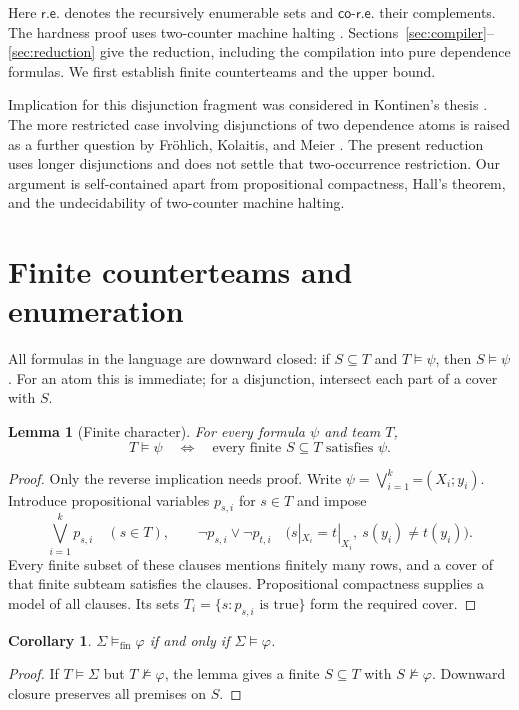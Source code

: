 \documentclass[11pt,a4paper]{article}
\newcommand{\dep}[2]{\mathord{=}(#1;#2)}
\newcommand{\fin}{\mathrm{fin}}
\newcommand{\RE}{\mathsf{r.e.}}
\newcommand{\coRE}{\mathsf{co\text{-}r.e.}}
\newtheorem{lemma}[theorem]{Lemma}
\newtheorem{corollary}[theorem]{Corollary}
\theoremstyle{definition}
\begin{document}
Here $\RE$ denotes the recursively enumerable sets and $\coRE$ their
complements. The hardness proof uses two-counter machine halting
\cite{Dudenhefner22}. Sections~\ref{sec:compiler}--\ref{sec:reduction}
give the reduction, including the compilation into pure dependence
formulas. We first establish finite counterteams and the upper bound.

Implication for this disjunction fragment was considered in
Kontinen's thesis \cite[Section~7.3]{Kontinen10}. The more restricted
case involving disjunctions of two dependence atoms is raised as a
further question by Fr\"ohlich, Kolaitis, and Meier
\cite[Section~6]{FKM26}. The present reduction uses longer disjunctions
and does not settle that two-occurrence restriction. Our argument is
self-contained apart from propositional compactness, Hall's theorem,
and the undecidability of two-counter machine halting.

\section{Finite counterteams and enumeration}
All formulas in the language are downward closed: if $S\subseteq T$ and
$T\models\psi$, then $S\models\psi$. For an atom this is immediate;
for a disjunction, intersect each part of a cover with $S$.

\begin{lemma}[Finite character]
\label{lem:finite-character}
For every formula $\psi$ and team $T$,
\[
 T\models\psi
 \quad\Longleftrightarrow\quad
 \text{every finite }S\subseteq T\text{ satisfies }\psi.
\]
\end{lemma}
\begin{proof}
Only the reverse implication needs proof. Write
$\psi=\bigvee_{i=1}^k\dep{X_i}{y_i}$. Introduce propositional variables
$p_{s,i}$ for $s\in T$ and impose
\[
 \bigvee_{i=1}^k p_{s,i}\quad(s\in T),
 \qquad
 \neg p_{s,i}\vee\neg p_{t,i}
 \quad\bigl(s|_{X_i}=t|_{X_i},\ s(y_i)\ne t(y_i)\bigr).
\]
Every finite subset of these clauses mentions finitely many rows, and
a cover of that finite subteam satisfies the clauses. Propositional
compactness supplies a model of all clauses. Its sets
$T_i=\{s:p_{s,i}\text{ is true}\}$ form the required cover.
\end{proof}

\begin{corollary}
\label{cor:finite}
$\Sigma\models_{\fin}\varphi$ if and only if $\Sigma\models\varphi$.
\end{corollary}
\begin{proof}
If $T\models\Sigma$ but $T\not\models\varphi$, the lemma gives a
finite $S\subseteq T$ with $S\not\models\varphi$. Downward closure
preserves all premises on $S$.
\end{proof}
\end{document}
